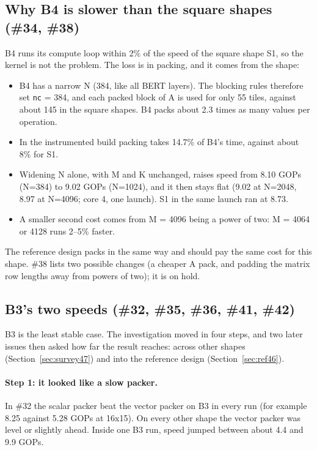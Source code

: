 \documentclass[11pt,a4paper]{article}
\begin{document}
\subsection{Why B4 is slower than the square shapes (\#34, \#38)}
\label{sec:b4}
B4 runs its compute loop within 2\% of the speed of the square shape S1, so the kernel is not the problem. The
loss is in packing, and it comes from the shape:
\begin{itemize}
  \item B4 has a narrow N (384, like all BERT layers). The blocking rules therefore set \texttt{nc} = 384, and each
  packed block of A is used for only 55 tiles, against about 145 in the square shapes. B4 packs about 2.3 times as
  many values per operation.
  \item In the instrumented build packing takes 14.7\% of B4's time, against about 8\% for S1.
  \item Widening N alone, with M and K unchanged, raises speed from 8.10 GOPs (N=384) to 9.02 GOPs (N=1024), and
  it then stays flat (9.02 at N=2048, 8.97 at N=4096; core 4, one launch). S1 in the same launch ran at 8.73.
  \item A smaller second cost comes from M = 4096 being a power of two: M = 4064 or 4128 runs 2--5\% faster.
\end{itemize}
The reference design packs in the same way and should pay the same cost for this shape. \#38 lists two possible
changes (a cheaper A pack, and padding the matrix row lengths away from powers of two); it is on hold.

\subsection{B3's two speeds (\#32, \#35, \#36, \#41, \#42)}
\label{sec:b3}
B3 is the least stable case. The investigation moved in four steps, and two later issues then asked how far the
result reaches: across other shapes (Section~\ref{sec:survey47}) and into the reference design (Section~\ref{sec:ref46}).

\paragraph{Step 1: it looked like a slow packer.} In \#32 the scalar packer beat the vector packer on B3 in every
run (for example 8.25 against 5.28 GOPs at 16x15). On every other shape the vector packer was level or slightly
ahead. Inside one B3 run, speed jumped between about 4.4 and 9.9 GOPs.
\end{document}
